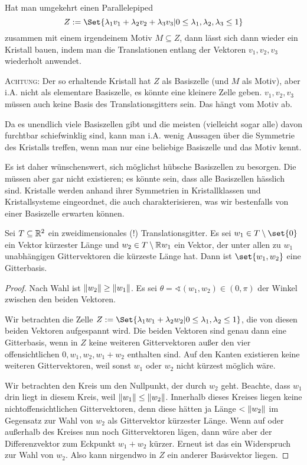 \begin{remark}
Hat man umgekehrt einen Parallelepiped
\[Z:=\Set{\lambda_1v_1+\lambda_2v_2+\lambda_3v_3 | 0\leq\lambda_1,\lambda_2,\lambda_3\leq 1}\]
zusammen mit einem irgendeinem Motiv $M\subseteq Z$, dann lässt sich dann wieder ein Kristall bauen, indem man die Translationen entlang der Vektoren $v_1,v_2,v_3$ wiederholt anwendet.

\textsc{Achtung}: Der so erhaltende Kristall hat $Z$ als Basiszelle (und $M$ als Motiv), aber i.A. nicht als elementare Basiszelle, es könnte eine kleinere Zelle geben. $v_1,v_2,v_3$ müssen auch keine Basis des Translationsgitters sein. Das hängt vom Motiv ab.
\end{remark}

\begin{remark}
Da es unendlich viele Basiszellen gibt und die meisten (vielleicht sogar alle) davon furchtbar schiefwinklig sind, kann man i.A. wenig Aussagen über die Symmetrie des Kristalls treffen, wenn man nur eine beliebige Basiszelle und das Motiv kennt.

Es ist daher wünschenswert, sich möglichst hübsche Basiszellen zu besorgen. Die müssen aber gar nicht existieren; es könnte sein, dass alle Basiszellen hässlich sind. Kristalle werden anhand ihrer Symmetrien in Kristallklassen und Kristallsysteme eingeordnet, die auch charakterisieren, was wir bestenfalls von einer Basiszelle erwarten können.
\end{remark}

\begin{lemma}\label{kristalle:gitterbasen_2D_kuerzeste_vektoren}
Sei $T\subseteq\mathbb{R}^2$ ein zweidimensionales (!) Translationsgitter. Es sei $w_1\in T\setminus\set{0}$ ein Vektor kürzester Länge und $w_2\in T \setminus \mathbb{R} w_1$ ein Vektor, der unter allen zu $w_1$ unabhängigen Gittervektoren die kürzeste Länge hat. Dann ist $\set{w_1,w_2}$ eine Gitterbasis.
\end{lemma}
\begin{proof}
Nach Wahl ist $\lVert w_2\rVert\geq\lVert w_1\rVert$. Es sei $\theta=\sphericalangle(w_1,w_2) \in (0,\pi)$ der Winkel zwischen den beiden Vektoren.

Wir betrachten die Zelle $Z:=\Set{\lambda_1 w_1+ \lambda_2 w_2 | 0\leq \lambda_1,\lambda_2\leq 1}$, die von diesen beiden Vektoren aufgespannt wird. Die beiden Vektoren sind genau dann eine Gitterbasis, wenn in $Z$ keine weiteren Gittervektoren außer den vier offensichtlichen $0,w_1,w_2,w_1+w_2$ enthalten sind. Auf den Kanten existieren keine weiteren Gittervektoren, weil sonst $w_1$ oder $w_2$ nicht kürzest möglich wäre.

Wir betrachten den Kreis um den Nullpunkt, der durch $w_2$ geht. Beachte, dass $w_1$ drin liegt in diesem Kreis, weil $\lVert w_1\rVert\leq \lVert w_2\rVert$. Innerhalb dieses Kreises liegen keine nichtoffensichtlichen Gittervektoren, denn diese hätten ja Länge $<\lVert w_2\rVert$ im Gegensatz zur Wahl von $w_2$ als Gittervektor kürzester Länge. Wenn auf oder außerhalb des Kreises nun noch Gittervektoren lägen, dann wäre aber der Differenzvektor zum Eckpunkt  $w_1+w_2$ kürzer. Erneut ist das ein Widerspruch zur Wahl von $w_2$. Also kann nirgendwo in $Z$ ein anderer Basisvektor liegen.
\end{proof}
